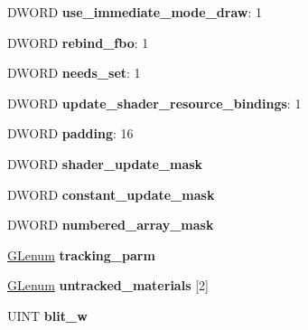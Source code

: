 \begin{DoxyCompactItemize}
D\+W\+O\+RD {\bfseries use\+\_\+immediate\+\_\+mode\+\_\+draw}\+: 1
\item 
\mbox{\label{structwined3d__context_a1bc875d1b0fefdf07043764e68da83fb}} 
D\+W\+O\+RD {\bfseries rebind\+\_\+fbo}\+: 1
\item 
\mbox{\label{structwined3d__context_a025022fa0555a1d0084793be7d216123}} 
D\+W\+O\+RD {\bfseries needs\+\_\+set}\+: 1
\item 
\mbox{\label{structwined3d__context_a0e671fc6afa08fc4b20c3c90d8a4b322}} 
D\+W\+O\+RD {\bfseries update\+\_\+shader\+\_\+resource\+\_\+bindings}\+: 1
\item 
\mbox{\label{structwined3d__context_a94b4f3d0e2c15472619cd15bbca03f86}} 
D\+W\+O\+RD {\bfseries padding}\+: 16
\item 
\mbox{\label{structwined3d__context_a5affb3b63e6e4ab3f0e68047ea32005f}} 
D\+W\+O\+RD {\bfseries shader\+\_\+update\+\_\+mask}
\item 
\mbox{\label{structwined3d__context_ae686abd497d32d352f63900e276b61ea}} 
D\+W\+O\+RD {\bfseries constant\+\_\+update\+\_\+mask}
\item 
\mbox{\label{structwined3d__context_aae931ecf68627f3d2908bf3d66fdb080}} 
D\+W\+O\+RD {\bfseries numbered\+\_\+array\+\_\+mask}
\item 
\mbox{\label{structwined3d__context_ac4180bc1177a0602c86a68baf4734577}} 
\hyperlink{interfacevoid}{G\+Lenum} {\bfseries tracking\+\_\+parm}
\item 
\mbox{\label{structwined3d__context_aea800c81cb723a9af5bc41e3a9e74832}} 
\hyperlink{interfacevoid}{G\+Lenum} {\bfseries untracked\+\_\+materials} \mbox{[}2\mbox{]}
\item 
\mbox{\label{structwined3d__context_ac8acfad4384f5c01d274009de0eebaa7}} 
U\+I\+NT {\bfseries blit\+\_\+w}
\item 
\mbox{\label{structwined3d__context_a68315e6e1742eddc2235f8346026fd97}} 

\end{DoxyCompactItemize}
